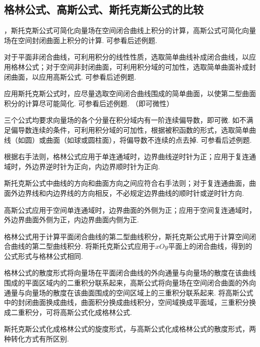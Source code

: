 \documentclass[12pt,UTF8,fleqn]{ctexart}
\begin{document}
\subsection{格林公式、高斯公式、斯托克斯公式的比较}
\begin{enumerate}

，斯托克斯公式可简化向量场在空间闭合曲线上积分的计算，高斯公式可简化向量场在空间封闭曲面上积分的计算. 可参看后述例题.

对于平面非闭合曲线，可利用积分的线性性质，选取简单曲线补成闭合曲线，以应用格林公式；对于空间非封闭曲面，可利用积分域的可加性，选取简单曲面补成封闭曲面，以应用高斯公式. 可参看后述例题.

应用斯托克斯公式时，应尽量选取空间闭合曲线围成的简单曲面，以使第二型曲面积分的计算尽可能简化. 可参看后述例题.
（即可微性）

三个公式均要求向量场的各个分量在积分域内有一阶连续偏导数，即可微. 如不满足偏导数连续的条件，可利用积分域的可加性，根据被积函数的形式，选取简单曲线（如圆）或曲面（如球或圆柱面），将偏导数不连续的点去掉. 可参看后述例题.

%
%

根据右手法则，格林公式应用于单连通域时，边界曲线逆时针为正；应用于复连通域时，外边界逆时针为正向，内边界顺时针为正向.

斯托克斯公式中曲线的方向和曲面方向之间应符合右手法则；对于复连通曲面，曲面外边界线和内边界线的方向相反，不必规定边界曲线的顺时针或逆时针方向.

高斯公式应用于空间单连通域时，边界曲面的外侧为正；应用于空间复连通域时，外边界曲面外侧为正，内边界曲面内侧为正.



格林公式用于计算平面闭合曲线的第二型曲线积分，斯托克斯公式用于计算空间闭合曲线的第二型曲线积分. 将斯托克斯公式应用于$xOy$平面上的闭合曲线，得到的公式形式与格林公式相同.

格林公式的散度形式将向量场在平面闭合曲线的外向通量与向量场的散度在该曲线围成的平面区域内的二重积分联系起来，高斯公式将向量场在空间闭合曲面的外向通量与向量场的散度在该曲面围成的空间区域上的三重积分联系起来. 将高斯公式中的封闭曲面换成曲线，曲面积分换成曲线积分，空间域换成平面域，三重积分换成二重积分，可将高斯公式化成格林公式.

斯托克斯公式化成格林公式的旋度形式，与高斯公式化成格林公式的散度形式，两种转化方式有所区别. 
\end{enumerate}
\end{document}
